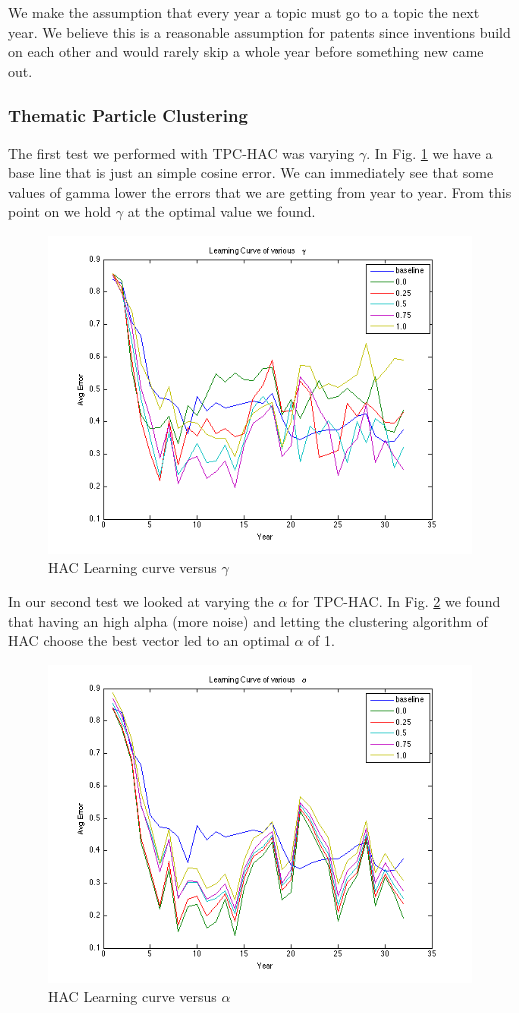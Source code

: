 \documentclass[conference]{IEEEtran}
\begin{document}
We make the assumption that every year a topic must go to a topic the next year. We believe this is a reasonable assumption for patents since inventions build on each other and would rarely skip a whole year before something new came out.

\subsubsection{Thematic Particle Clustering}

The first test we performed with TPC-HAC was varying $\gamma$. In Fig. \ref{hac_gamma} we have a base line that is just an simple cosine error. We can immediately see that some values of gamma lower the errors that we are getting from year to year. From this point on we hold $\gamma$ at the optimal value we found.

\begin{figure}[h]
	\center
	\includegraphics[width=.50\textwidth]{fig/hac_gamma.png}
	\caption{HAC Learning curve versus $\gamma$}
	\label{hac_gamma}
\end{figure}

In our second test we looked at varying the $\alpha$ for TPC-HAC. In Fig. \ref{hac_alpha} we found that having an high alpha (more noise) and letting the clustering algorithm of HAC choose the best vector led to an optimal $\alpha$ of 1.

\begin{figure}[h]
	\center
	\includegraphics[width=.50\textwidth]{fig/hac_alpha.png}
	\caption{HAC Learning curve versus $\alpha$}
	\label{hac_alpha}
\end{figure}
\end{document}
